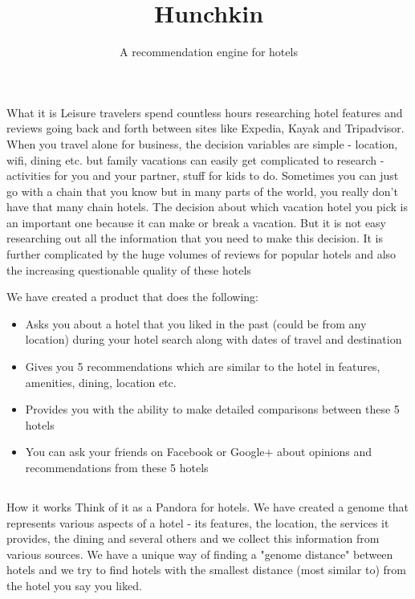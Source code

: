\documentclass[DIV=calc, paper=a4, fontsize=11pt, twocolumn]{scrartcl}	 %
\title{Hunchkin} %
\author{A recommendation engine for hotels} %
\date{} %
\newcommand{\initial}[1]{ %
\lettrine[lines=2,lhang=0.1,nindent=0em]{
\color{DarkGoldenrod}
{\textsf{#1}}}{}}
\begin{document}
\maketitle %

\thispagestyle{fancy} %
\section*{}

\initial{What it is }
Leisure travelers spend countless hours researching hotel features and reviews going back and forth between sites like Expedia, Kayak and Tripadvisor. When you travel alone for business, the decision variables are simple - location, wifi, dining etc. but family vacations can easily get complicated to research - activities for you and your partner, stuff for kids to do. Sometimes you can just go with a chain that you know but in many parts of the world, you really don't have that many chain hotels. The decision about which vacation hotel you pick is an important one because it can make or break a vacation. But it is not easy researching out all the information that you need to make this decision. It is further complicated by the huge volumes of reviews for popular hotels and also the increasing questionable quality of these hotels
\par
We have created a product that does the following:
\begin{itemize}
\item Asks you about a hotel that you liked in the past (could be from any location) during your hotel search along with dates of travel and destination
\item Gives you 5 recommendations which are similar to the hotel in features, amenities, dining, location etc.
\item Provides you with the ability to make detailed comparisons between these 5 hotels
\item You can ask your friends on Facebook or Google+ about opinions and recommendations from these 5 hotels
\end{itemize}

\subsection*{}

\initial{How it works }
Think of it as a Pandora for hotels. We have created a genome that represents various aspects of a hotel - its features, the location, the services it provides, the dining and several others and we collect this information from various sources. We have a unique way of finding a "genome distance" between hotels and we try to find hotels with the smallest distance (most similar to) from the hotel you say you liked. 
\end{document}
